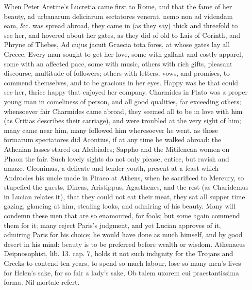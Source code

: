 {When Peter Aretine's Lucretia came first to Rome, and that the
fame of her beauty, ad urbanarum deliciarum sectatores venerat, nemo
non ad videndam eam, \&c. was spread abroad, they came in (as they say)
thick and threefold to see her, and hovered about her gates, as they
did of old to Lais of Corinth, and Phryne of Thebes, Ad cujus
jacuit Graecia tota fores, at whose gates lay all Greece. Every
man sought to get her love, some with gallant and costly apparel, some
with an affected pace, some with music, others with rich gifts,
pleasant discourse, multitude of followers; others with letters, vows,
and promises, to commend themselves, and to be gracious in her eyes.
Happy was he that could see her, thrice happy that enjoyed her company.
Charmides in Plato was a proper young man in comeliness of
person, and all good qualities, far exceeding others; whensoever fair
Charmides came abroad, they seemed all to be in love with him (as
Critias describes their carriage), and were troubled at the very sight
of him; many came near him, many followed him wheresoever he went, as
those formarum spectatores did Acontius, if at any time he walked
abroad: the Athenian lasses stared on Alcibiades; Sappho and the
Mitilenean women on Phaon the fair. Such lovely sights do not only
please, entice, but ravish and amaze. Cleonimus, a delicate and tender
youth, present at a feast which Androcles his uncle made in Piraeo at
Athens, when he sacrificed to Mercury, so stupefied the guests, Dineas,
Aristippus, Agasthenes, and the rest (as Charidemus in Lucian
relates it), that they could not eat their meat, they sat all supper
time gazing, glancing at him, stealing looks, and admiring of his
beauty. Many will condemn these men that are so enamoured, for fools;
but some again commend them for it; many reject Paris's judgment, and
yet Lucian approves of it, admiring Paris for his choice; he would have
done as much himself, and by good desert in his mind: beauty is to be
preferred before wealth or wisdom. Athenaeus Deipnosophist,
lib. 13. cap. 7, holds it not such indignity for the Trojans and Greeks
to contend ten years, to spend so much labour, lose so many men's lives
for Helen's sake, for so fair a lady's sake,
Ob talem uxorem cui praestantissima forma,
Nil mortale refert.

}

